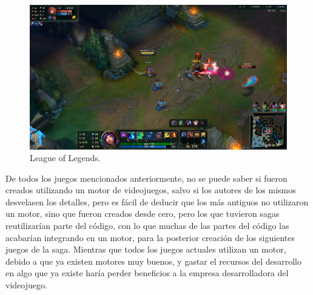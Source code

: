 \begin{itemize}
	\begin{figure}[h]
		\centering
		\includegraphics[width=15cm]{archivos/imagenes/league-of-legends.png}
		\caption{League of Legends.}
	\end{figure}
\end{itemize}

De todos los juegos mencionados anteriormente, no se puede saber si fueron creados utilizando un motor de videojuegos, salvo si los autores de los mismos desvelasen los detalles, pero es fácil de deducir que los más antiguos no utilizaron un motor, sino que fueron creados desde cero, pero los que tuvieron sagas reutilizarían parte del código, con lo que muchas de las partes del código las acabarían integrando en un motor, para la posterior creación de los siguientes juegos de la saga. Mientras que todos los juegos actuales utilizan un motor, debido a que ya existen motores muy buenos, y gastar el recursos del desarrollo en algo que ya existe haría perder beneficios a la empresa desarrolladora del videojuego.

